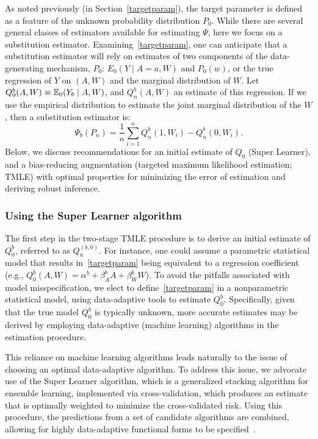 As noted previously (in Section~\ref{targetparam}), the target parameter is
defined as a feature of the unknown probability distribution $P_{0}$. While
there are several general classes of estimators available for estimating
$\Psi$, here we focus on a substitution estimator. Examining~\ref{targetparam},
one can anticipate that a substitution estimator will rely on estimates of
two components of the data-generating mechanism, $P_0$: $E_0 (Y \mid A=a, W)$
and $P_0(w)$, or the true regression of $Y$ on $(A,W)$ and the marginal
distribution of $W$. Let $Q^{b}_{0}(A, W) \equiv \mathbb{E}_{0}(Y_{b} \mid A, W)$, and
$Q^{b}_{n}(A,W)$ an estimate of this regression. If we use the empirical
distribution to estimate the joint marginal distribution of the $W$, then a
substitution estimator is:
\begin{equation}
\label{subest}
\Psi_b(P_{n}) = \frac{1}{n}\sum_{i = 1}^{n} Q^{b}_{n}(1, W_{i}) - Q^{b}_{n}(0, W_{i}).
\end{equation}
Below, we discuss recommendations for an initial estimate of $Q_0$ (Super
Learner), and a bias-reducing augmentation (targeted maximum likelihood
estimation; TMLE) with optimal properties for minimizing the error of
estimation and deriving robust inference.

\subsubsection{Using the Super Learner algorithm}\label{superlearner}

The first step in the two-stage TMLE procedure is to derive an initial estimate
of $Q^{b}_{0}$, referred to as $Q^{(b, 0)}_{n}$. For instance, one could assume
a parametric statistical model that results in~\ref{targetparam} being
equivalent to a regression coefficient (e.g., $Q^{b}_{0}(A, W) = \alpha^{b} +
\beta^{b}_{A}A + \beta^{b}_{W}W$). To avoid the pitfalls associated with model
misspecification, we elect to define~\ref{targetparam} in a nonparametric
statistical model, using data-adaptive tools to estimate $Q^{b}_{0}$.
Specifically, given that the true model $Q^{b}_{0}$ is typically unknown, more
accurate estimates may be derived by employing data-adaptive (machine learning)
algorithms in the estimation procedure.

This reliance on machine learning algorithms leads naturally to the issue of
choosing an optimal data-adaptive algorithm. To address this issue, we advocate
use of the Super Learner algorithm, which is a generalized stacking algorithm
for ensemble learning, implemented via cross-validation, which produces an
estimate that is optimally weighted to minimize the cross-validated risk. Using
this procedure, the predictions from a set of candidate algorithms are
combined, allowing for highly data-adaptive functional forms to be
specified~\cite{van2007super}.

